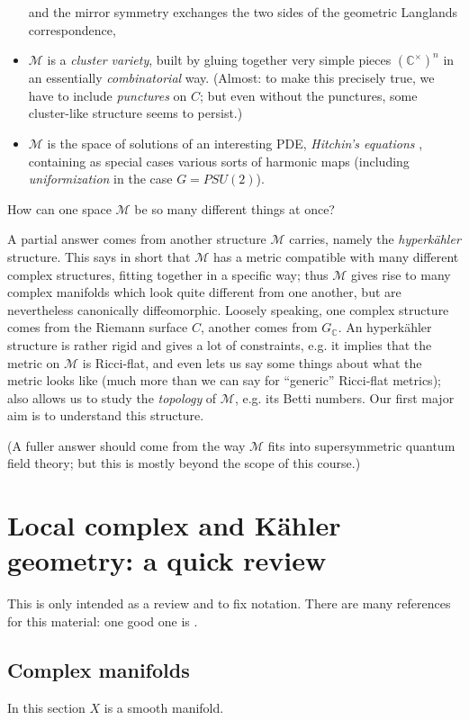 \documentclass[12pt,letterpaper,reqno]{amsart}
\numberwithin{equation}{section}
\newcommand{\cM}{\ensuremath{\mathcal M}}
\newcommand{\C}{\ensuremath{\mathbb C}}
\newcommand{\kahler}{K\"ahler\xspace}
\newcommand{\hk}{hyperk\"ahler\xspace}
\newcommand{\ti}[1]{\textit{#1}}
\begin{document}
\begin{itemize}
and the mirror symmetry
exchanges the two sides of the geometric Langlands correspondence,
\item $\cM$ is a \ti{cluster variety}, built by gluing together
very simple pieces $(\C^\times)^n$ in an essentially \ti{combinatorial} way. (Almost: to make this precisely true, we have to include \ti{punctures} on $C$; but even without the punctures, some cluster-like
structure seems to persist.)
\item $\cM$ is the space of solutions of an interesting PDE, \ti{Hitchin's equations} \cite{MR89a:32021}, containing as special cases various sorts of harmonic maps (including \ti{uniformization} in the case $G = PSU(2)$).
\end{itemize}

How can one space $\cM$ be so many different things at once?

A partial answer comes from another structure $\cM$ carries, namely
the \ti{\hk} structure. This says in short that $\cM$ has a 
metric compatible with many
different complex structures,
fitting together in a specific way; thus $\cM$ gives rise to
many complex manifolds which look quite different from one
another, but are nevertheless canonically diffeomorphic.
Loosely speaking, one complex structure comes from the Riemann 
surface $C$, another comes from $G_\C$.
An \hk structure is rather rigid and gives a lot of constraints, e.g.
it implies that the metric on $\cM$ is Ricci-flat, and even lets 
us say some things about what the metric looks like (much
more than we can say for ``generic'' Ricci-flat metrics);
also allows us to study the \ti{topology} of $\cM$, e.g. 
its Betti numbers.
Our first major aim is to understand this structure.

(A fuller answer should come from the way $\cM$
fits into supersymmetric quantum field theory; but this is 
mostly beyond the scope of this course.)


\section{Local complex and \kahler geometry: a quick review}

This is only intended as a review and to fix notation.
There are many references for this material: one
good one is \cite{MR2093043}.


\subsection{Complex manifolds} 
In this section $X$ is a smooth manifold.
\end{document}
